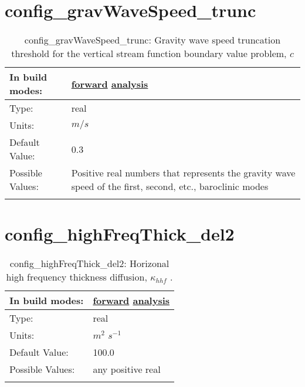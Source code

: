 \section[config\_gravWaveSpeed\_trunc]{config\_gravWaveSpeed\_trunc}
\label{sec:nm_sec_config_gravWaveSpeed_trunc}
\begin{center}
\begin{longtable}{| p{2.0in} || p{4.0in} |}
    \hline
    In build modes: & \hyperref[subsec:forward_nm_tab_mesoscale_eddy_parameterization]{forward} \hyperref[subsec:analysis_nm_tab_mesoscale_eddy_parameterization]{analysis} \\
    \hline
    Type: & real \\
    \hline
    Units: & $m/s$ \\
    \hline
    Default Value: & 0.3 \\
    \hline
    Possible Values: & Positive real numbers that represents the gravity wave speed of the first, second, etc., baroclinic modes \\
    \hline
    \caption{config\_gravWaveSpeed\_trunc:  Gravity wave speed truncation threshold for the vertical stream function boundary value problem,  $c$ }
\end{longtable}
\end{center}
\section[config\_highFreqThick\_del2]{config\_highFreqThick\_del2}
\label{sec:nm_sec_config_highFreqThick_del2}
\begin{center}
\begin{longtable}{| p{2.0in} || p{4.0in} |}
    \hline
    In build modes: & \hyperref[subsec:forward_nm_tab_ALE_frequency_filtered_thickness]{forward} \hyperref[subsec:analysis_nm_tab_ALE_frequency_filtered_thickness]{analysis} \\
    \hline
    Type: & real \\
    \hline
    Units: & $m^2$ $s^{-1}$ \\
    \hline
    Default Value: & 100.0 \\
    \hline
    Possible Values: & any positive real \\
    \hline
    \caption{config\_highFreqThick\_del2:  Horizonal high frequency thickness diffusion,  $\kappa_{hhf}$ .}
\end{longtable}
\end{center}
